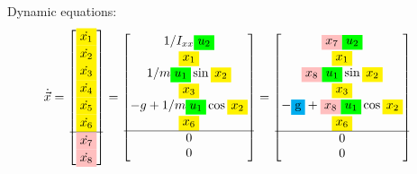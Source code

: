 \documentclass[12pt]{article}
\begin{document}
Dynamic equations:
\begin{align*}
    \dot{\vec{x}} &= \begin{bmatrix}
        \colorbox{yellow}{$\dot{x_1}$} \\
        \colorbox{yellow}{$\dot{x_2}$} \\
        \colorbox{yellow}{$\dot{x_3}$} \\
        \colorbox{yellow}{$\dot{x_4}$} \\
        \colorbox{yellow}{$\dot{x_5}$} \\
        \colorbox{yellow}{$\dot{x_6}$} \\
        \hline
        \colorbox{pink}{$\dot{x_7}$} \\
        \colorbox{pink}{$\dot{x_8}$} \\
    \end{bmatrix} = \begin{bmatrix}
        1/I_{xx} \colorbox{green}{$u_2$} \\ 
        \colorbox{yellow}{$x_1$} \\
        1/m \colorbox{green}{$u_1$} \sin{\colorbox{yellow}{$x_2$}} \\
        \colorbox{yellow}{$x_3$} \\
        -g + 1/m \colorbox{green}{$u_1$} \cos{\colorbox{yellow}{$x_2$}} \\
        \colorbox{yellow}{$x_6$} \\
        \hline
        0 \\
        0 \\
    \end{bmatrix} = \begin{bmatrix}
        \colorbox{pink}{$x_7$} \colorbox{green}{$u_2$} \\
        \colorbox{yellow}{$x_1$} \\
        \colorbox{pink}{$x_8$} \colorbox{green}{$u_1$} \sin{\colorbox{yellow}{$x_2$}} \\
        \colorbox{yellow}{$x_3$} \\
        -\colorbox{cyan}{g} + \colorbox{pink}{$x_8$} \colorbox{green}{$u_1$} \cos{\colorbox{yellow}{$x_2$}} \\
        \colorbox{yellow}{$x_6$} \\
        \hline
        0 \\
        0 \\

\end{bmatrix}
\end{align*}
\end{document}

